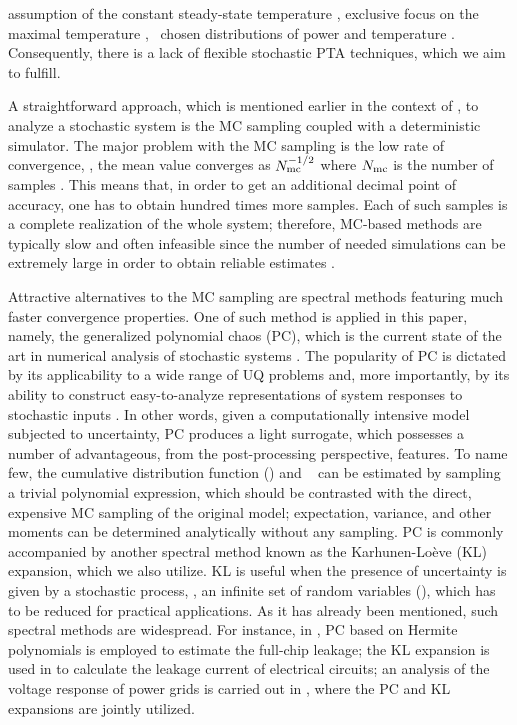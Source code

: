 assumption of the constant steady-state temperature \cite{juan2011, juan2012}, exclusive focus on the maximal temperature \cite{juan2011}, \apriori\ chosen distributions of power and temperature \cite{juan2012, srivastava2010}. Consequently, there is a lack of flexible stochastic PTA techniques, which we aim to fulfill.


A straightforward approach, which is mentioned earlier in the context of \cite{chandra2010}, to analyze a stochastic system is the MC sampling coupled with a deterministic simulator. The major problem with the MC sampling is the low rate of convergence, \eg, the mean value converges as $N_\text{mc}^{-{{1}/{2}}}$ where $N_\text{mc}$ is the number of samples \cite{xiu2010, maitre2010}. This means that, in order to get an additional decimal point of accuracy, one has to obtain hundred times more samples. Each of such samples is a complete realization of the whole system; therefore, MC-based methods are typically slow and often infeasible since the number of needed simulations can be extremely large in order to obtain reliable estimates \cite{diaz-emparanza2002}.

Attractive alternatives to the MC sampling are spectral methods \cite{xiu2010, maitre2010, ghanem1991} featuring much faster convergence properties. One of such method is applied in this paper, namely, the generalized polynomial chaos (PC), which is the current state of the art in numerical analysis of stochastic systems \cite{xiu2010}. The popularity of PC is dictated by its applicability to a wide range of UQ problems and, more importantly, by its ability to construct easy-to-analyze representations of system responses to stochastic inputs \cite{eldred2009}. In other words, given a computationally intensive model subjected to uncertainty, PC produces a light surrogate, which possesses a number of advantageous, from the post-processing perspective, features. To name few, the cumulative distribution function (\cdf) and \pdf\ \cite{durrett2010} can be estimated by sampling a trivial polynomial expression, which should be contrasted with the direct, expensive MC sampling of the original model; expectation, variance, and other moments can be determined analytically without any sampling. PC is commonly accompanied by another spectral method known as the Karhunen-Lo\`{e}ve (KL) expansion, which we also utilize. KL is useful when the presence of uncertainty is given by a stochastic process, \ie, an infinite set of random variables (\rvs), which has to be reduced for practical applications. As it has already been mentioned, such spectral methods are widespread. For instance, in \cite{shen2009}, PC based on Hermite polynomials is employed to estimate the full-chip leakage; the KL expansion is used in \cite{bhardwaj2006} to calculate the leakage current of electrical circuits; an analysis of the voltage response of power grids is carried out in \cite{ghanta2006}, where the PC and KL expansions are jointly utilized.

